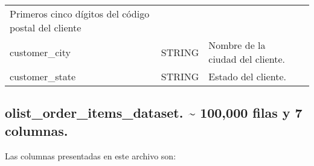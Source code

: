 \documentclass[11pt]{article}
\begin{document}
\begin{longtable}[]{@{}llll@{}}
\begin{minipage}[t]{0.22\columnwidth}
Primeros cinco dígitos del código postal del cliente\strut
\end{minipage} & \begin{minipage}[t]{0.22\columnwidth}\raggedright
\strut
\end{minipage}\tabularnewline
\begin{minipage}[t]{0.22\columnwidth}\raggedright
customer\_city\strut
\end{minipage} & \begin{minipage}[t]{0.22\columnwidth}\raggedright
STRING\strut
\end{minipage} & \begin{minipage}[t]{0.22\columnwidth}\raggedright
Nombre de la ciudad del cliente.\strut
\end{minipage} & \begin{minipage}[t]{0.22\columnwidth}\raggedright
\strut
\end{minipage}\tabularnewline
\begin{minipage}[t]{0.22\columnwidth}\raggedright
customer\_state\strut
\end{minipage} & \begin{minipage}[t]{0.22\columnwidth}\raggedright
STRING\strut
\end{minipage} & \begin{minipage}[t]{0.22\columnwidth}\raggedright
Estado del cliente.\strut
\end{minipage} & \begin{minipage}[t]{0.22\columnwidth}\raggedright
\strut
\end{minipage}\tabularnewline
\bottomrule
\end{longtable}

    \hypertarget{olist_order_items_dataset.-100000-filas-y-7-columnas.}{%
\subsection{olist\_order\_items\_dataset. \textasciitilde{} 100,000
filas y 7
columnas.}\label{olist_order_items_dataset.-100000-filas-y-7-columnas.}}

Las columnas presentadas en este archivo son:
\end{document}

